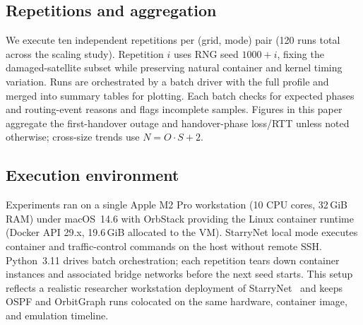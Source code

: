 \subsection{Repetitions and aggregation}

We execute ten independent repetitions per (grid, mode) pair (120 runs total
across the scaling study).
Repetition $i$ uses RNG seed $1000 + i$, fixing the damaged-satellite subset
while preserving natural container and kernel timing variation.
Runs are orchestrated by a batch driver with the full profile and merged into
summary tables for plotting.
Each batch checks for expected phases and routing-event reasons and flags
incomplete samples.
Figures in this paper aggregate the first-handover outage and handover-phase
loss/RTT unless noted otherwise; cross-size trends use $N = O \cdot S + 2$.

\subsection{Execution environment}

Experiments ran on a single Apple M2 Pro workstation (10 CPU cores, 32\,GiB
RAM) under macOS~14.6 with OrbStack providing the Linux container runtime
(Docker API 29.x, 19.6\,GiB allocated to the VM).
StarryNet local mode executes container and traffic-control commands on the
host without remote SSH.
Python~3.11 drives batch orchestration; each repetition tears down container
instances and associated bridge networks before the next seed starts.
This setup reflects a realistic researcher workstation deployment of
StarryNet~\cite{lai2023starrynet} and keeps OSPF and OrbitGraph runs colocated
on the same hardware, container image, and emulation timeline.
